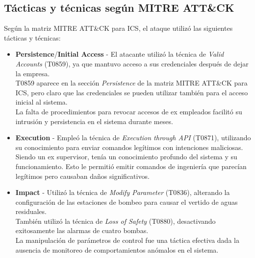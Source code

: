 \nl

\subsection{Tácticas y técnicas según MITRE ATT\&CK}
Según la matriz MITRE ATT\&CK para ICS, el ataque utilizó las siguientes tácticas y técnicas:

\begin{itemize}
    \item \textbf{Persistence}/\textbf{Initial Access} - El atacante utilizó la técnica de \textit{Valid Accounts} (T0859), ya que mantuvo acceso a sus credenciales después de dejar la empresa.\\
    T0859 aparece en la sección \textit{Persistence} de la matriz MITRE ATT\&CK para ICS, pero claro que las credenciales se pueden utilizar también para el acceso inicial al sistema.\\
    La falta de procedimientos para revocar accesos de ex empleados facilitó su intrusión y persistencia en el sistema durante meses.
    
    
    \item \textbf{Execution} - Empleó la técnica de \textit{Execution through API} (T0871), utilizando su conocimiento para enviar comandos legítimos con intenciones maliciosas.\\
    Siendo un ex supervisor, tenía un conocimiento profundo del sistema y su funcionamiento. Esto le permitió emitir comandos de ingeniería que parecían legítimos pero causaban daños significativos.
    
    \item \textbf{Impact} - Utilizó la técnica de \textit{Modify Parameter} (T0836), alterando la configuración de las estaciones de bombeo para causar el vertido de aguas residuales.\\
    También utilizó la técnica de \textit{Loss of Safety} (T0880), desactivando exitosamente las alarmas de cuatro bombas.\\
    La manipulación de parámetros de control fue una táctica efectiva dada la ausencia de monitoreo de comportamientos anómalos en el sistema.
\end{itemize}

